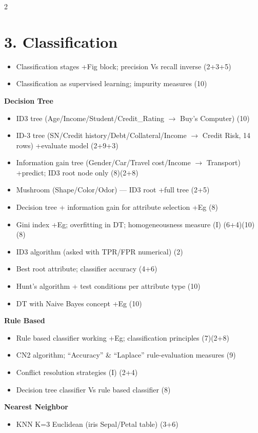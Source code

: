 \documentclass[10pt]{article}
\begin{document}
\begin{multicols}{2}
\section*{3. Classification}
\begin{itemize}
  \item Classification stages +Fig block; precision Vs recall inverse \hfill (2+3+5)
  \item Classification as supervised learning; impurity measures \hfill (10)
\end{itemize}
\textbf{Decision Tree}
\begin{itemize}
  \item ID3 tree (Age/Income/Student/Credit\_Rating $\to$ Buy's Computer) \hfill (10)
  \item ID-3 tree (SN/Credit history/Debt/Collateral/Income $\to$ Credit Risk, 14 rows) +evaluate model \hfill (2+9+3)
  \item Information gain tree (Gender/Car/Travel cost/Income $\to$ Transport) +predict; ID3 root node only \hfill (8)(2+8)
  \item Mushroom (Shape/Color/Odor) --- ID3 root +full tree \hfill (2+5)
  \item Decision tree + information gain for attribute selection +Eg \hfill (8)
  \item Gini index +Eg; overfitting in DT; homogeneousness measure (I) \hfill (6+4)(10)(8)
  \item ID3 algorithm (asked with TPR/FPR numerical) \hfill (2)
  \item Best root attribute; classifier accuracy \hfill (4+6)
  \item Hunt's algorithm + test conditions per attribute type \hfill (10)
  \item DT with Naive Bayes concept +Eg \hfill (10)
\end{itemize}
\textbf{Rule Based}
\begin{itemize}
  \item Rule based classifier working +Eg; classification principles \hfill (7)(2+8)
  \item CN2 algorithm; ``Accuracy'' \& ``Laplace'' rule-evaluation measures \hfill (9)
  \item Conflict resolution strategies (I) \hfill (2+4)
  \item Decision tree classifier Vs rule based classifier \hfill (8)
\end{itemize}
\textbf{Nearest Neighbor}
\begin{itemize}
  \item KNN K=3 Euclidean (iris Sepal/Petal table) \hfill (3+6)

\end{itemize}
\end{multicols}
\end{document}
